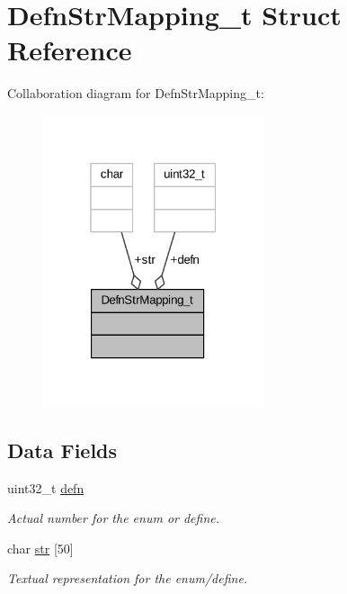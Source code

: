 \hypertarget{struct_defn_str_mapping__t}{}\section{Defn\+Str\+Mapping\+\_\+t Struct Reference}
\label{struct_defn_str_mapping__t}


Collaboration diagram for Defn\+Str\+Mapping\+\_\+t\+:
\nopagebreak
\begin{figure}[H]
\begin{center}
\leavevmode
\includegraphics[width=184pt]{struct_defn_str_mapping__t__coll__graph}
\end{center}
\end{figure}
\subsection*{Data Fields}
\begin{DoxyCompactItemize}
\item 
uint32\+\_\+t \hyperlink{struct_defn_str_mapping__t_ad5114f65b4eeea55b356bef3aaca050a}{defn}
\begin{DoxyCompactList}\small\item\em Actual number for the enum or define. \end{DoxyCompactList}\item 
char \hyperlink{struct_defn_str_mapping__t_a3ef8f1bca4f8a41b84b9a55c5528408e}{str} \mbox{[}50\mbox{]}
\begin{DoxyCompactList}\small\item\em Textual representation for the enum/define. \end{DoxyCompactList}\end{DoxyCompactItemize}


